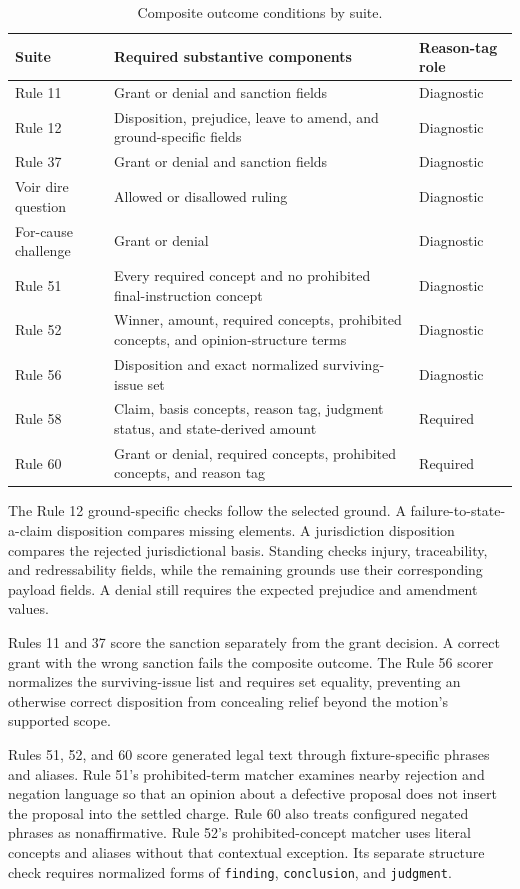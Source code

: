 \documentclass[11pt]{article}
\newcommand{\code}[1]{\texttt{#1}}
\begin{document}
\begin{table}[htbp]
\centering
\small
\caption{Composite outcome conditions by suite.}
\label{tab:scoring}
\begin{tabularx}{\textwidth}{@{}lXl@{}}
\toprule
Suite & Required substantive components & Reason-tag role \\
\midrule
Rule 11 & Grant or denial and sanction fields & Diagnostic \\
Rule 12 & Disposition, prejudice, leave to amend, and ground-specific fields & Diagnostic \\
Rule 37 & Grant or denial and sanction fields & Diagnostic \\
Voir dire question & Allowed or disallowed ruling & Diagnostic \\
For-cause challenge & Grant or denial & Diagnostic \\
Rule 51 & Every required concept and no prohibited final-instruction concept & Diagnostic \\
Rule 52 & Winner, amount, required concepts, prohibited concepts, and opinion-structure terms & Diagnostic \\
Rule 56 & Disposition and exact normalized surviving-issue set & Diagnostic \\
Rule 58 & Claim, basis concepts, reason tag, judgment status, and state-derived amount & Required \\
Rule 60 & Grant or denial, required concepts, prohibited concepts, and reason tag & Required \\
\bottomrule
\end{tabularx}
\end{table}

The Rule 12 ground-specific checks follow the selected ground.  A failure-to-state-a-claim disposition compares missing elements.  A jurisdiction disposition compares the rejected jurisdictional basis.  Standing checks injury, traceability, and redressability fields, while the remaining grounds use their corresponding payload fields.  A denial still requires the expected prejudice and amendment values.

Rules 11 and 37 score the sanction separately from the grant decision.  A correct grant with the wrong sanction fails the composite outcome.  The Rule 56 scorer normalizes the surviving-issue list and requires set equality, preventing an otherwise correct disposition from concealing relief beyond the motion's supported scope.

Rules 51, 52, and 60 score generated legal text through fixture-specific phrases and aliases.  Rule 51's prohibited-term matcher examines nearby rejection and negation language so that an opinion about a defective proposal does not insert the proposal into the settled charge.  Rule 60 also treats configured negated phrases as nonaffirmative.  Rule 52's prohibited-concept matcher uses literal concepts and aliases without that contextual exception.  Its separate structure check requires normalized forms of \code{finding}, \code{conclusion}, and \code{judgment}.
\end{document}
